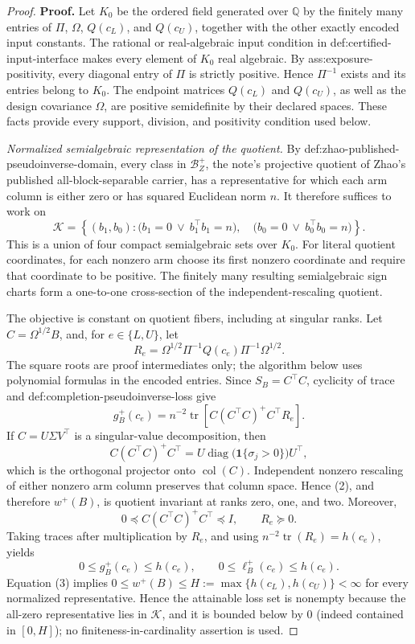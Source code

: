 \documentclass{article}
\begin{document}
\begin{proof}
\textbf{Proof.}
Let \(K_0\) be the ordered field generated over \(\mathbb Q\) by the finitely many entries of \(\Pi\), \(\Omega\), \(Q(c_L)\), and \(Q(c_U)\), together with the other exactly encoded input constants.  The rational or real-algebraic input condition in def:certified-input-interface makes every element of \(K_0\) real algebraic.  By ass:exposure-positivity, every diagonal entry of \(\Pi\) is strictly positive.  Hence \(\Pi^{-1}\) exists and its entries belong to \(K_0\).  The endpoint matrices \(Q(c_L)\) and \(Q(c_U)\), as well as the design covariance \(\Omega\), are positive semidefinite by their declared spaces.  These facts provide every support, division, and positivity condition used below.

\emph{Normalized semialgebraic representation of the quotient.}
By def:zhao-published-pseudoinverse-domain, every class in \(\mathcal B_Z^+\), the note's projective quotient of Zhao's published all-block-separable carrier, has a representative for which each arm column is either zero or has squared Euclidean norm \(n\).  It therefore suffices to work on
\[
\mathcal K=
\left\{(b_1,b_0):
\bigl(b_1=0\ \vee\ b_1^{\top}b_1=n\bigr),\quad
\bigl(b_0=0\ \vee\ b_0^{\top}b_0=n\bigr)
\right\}.
\tag{1}
\]
This is a union of four compact semialgebraic sets over \(K_0\).  For literal quotient coordinates, for each nonzero arm choose its first nonzero coordinate and require that coordinate to be positive.  The finitely many resulting semialgebraic sign charts form a one-to-one cross-section of the independent-rescaling quotient.

The objective is constant on quotient fibers, including at singular ranks.  Let \(C=\Omega^{1/2}B\), and, for \(e\in\{L,U\}\), let
\[
R_e=\Omega^{1/2}\Pi^{-1}Q(c_e)\Pi^{-1}\Omega^{1/2}.
\]
The square roots are proof intermediates only; the algorithm below uses polynomial formulas in the encoded entries.  Since \(S_B=C^{\top}C\), cyclicity of trace and def:completion-pseudoinverse-loss give
\[
g_B^+(c_e)
=n^{-2}\operatorname{tr}\!\left[
C(C^{\top}C)^+C^{\top}R_e
\right].
\tag{2}
\]
If \(C=U\Sigma V^{\top}\) is a singular-value decomposition, then
\[
C(C^{\top}C)^+C^{\top}
=U\operatorname{diag}\!\bigl(\mathbf 1\{\sigma_j>0\}\bigr)U^{\top},
\]
which is the orthogonal projector onto \(\operatorname{col}(C)\).  Independent nonzero rescaling of either nonzero arm column preserves that column space.  Hence (2), and therefore \(w^+(B)\), is quotient invariant at ranks zero, one, and two.  Moreover,
\[
0\preceq C(C^{\top}C)^+C^{\top}\preceq I,
\qquad R_e\succeq0.
\]
Taking traces after multiplication by \(R_e\), and using \(n^{-2}\operatorname{tr}(R_e)=h(c_e)\), yields
\[
0\le g_B^+(c_e)\le h(c_e),
\qquad
0\le \ell_B^+(c_e)\le h(c_e).
\tag{3}
\]
Equation (3) implies \(0\le w^+(B)\le H:=\max\{h(c_L),h(c_U)\}<\infty\) for every normalized representative.  Hence the attainable loss set is nonempty because the all-zero representative lies in \(\mathcal K\), and it is bounded below by \(0\) (indeed contained in \([0,H]\)); no finiteness-in-cardinality assertion is used.


\end{proof}
\end{document}
